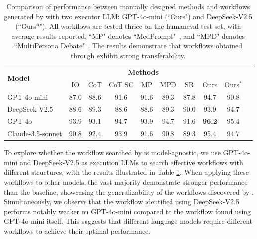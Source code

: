 \begin{table}[!htbp]
\caption{Comparison of performance between manually designed methods and workflows generated by \model with two executor LLM: GPT-4o-mini (``Ours") and DeepSeek-V2.5 (``Ours*"). All workflows are tested thrice on the humaneval test set, with average results reported. ``MP" denotes ``MedPrompt"~\citep{nori2023medprompt}, and ``MPD" denotes ``MultiPersona Debate"~\citep{wang2023multipersona}. The results demonstrate that workflows obtained through \model exhibit strong transferability.}
\scriptsize
\renewcommand\tabcolsep{5.0pt}
\renewcommand\arraystretch{1.2}
\small
\setlength{\abovecaptionskip}{0.1cm}
\setlength{\belowcaptionskip}{-0.2cm}
\centering
\begin{tabular}{l|ccccccccc}
\hline

\hline

\hline

\hline
\multirow{2}{*}{\textbf{Model}} & \multicolumn{7}{c}{\textbf{Methods}}\\
& IO & CoT & CoT SC & MP & MPD &  SR & Ours & Ours$^{*}$ \\
\hline
GPT-4o-mini & 87.0 & 88.6 & 91.6 & 91.6 & 89.3 & 87.8 & 94.7 & 90.8 \\
DeepSeek-V2.5 & 88.6 & 89.3 & 88.6 & 88.6 & 89.3 & 90.0 & 93.9 & 94.7 \\
GPT-4o & 93.9 & 93.1 & 94.7 & 93.9 & 94.7& 91.6 & \textbf{96.2} & 95.4 \\
Claude-3.5-sonnet & 90.8 & 92.4 & 93.9 & 91.6 & 90.8 & 89.3 & 95.4 & 94.7 \\
\hline

\hline

\hline

\hline
\end{tabular}
\label{tab:humaneval}
\end{table}

To explore whether the workflow searched by \model is model-agnostic, we use GPT-4o-mini and DeepSeek-V2.5 as execution LLMs to search effective workflows with different structures, with the results illustrated in Table \ref{tab:humaneval}. When applying these workflows to other models, the vast majority demonstrate stronger performance than the baseline, showcasing the generalizability of the workflows discovered by \model. Simultaneously, we observe that the workflow identified using DeepSeek-V2.5 performs notably weaker on GPT-4o-mini compared to the workflow found using GPT-4o-mini itself. This suggests that different language models require different workflows to achieve their optimal performance.



